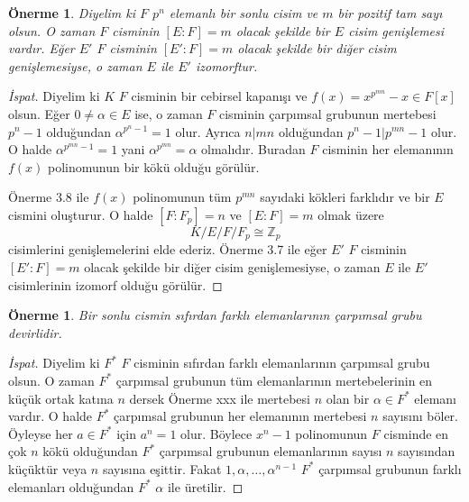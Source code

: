 \documentclass[draft]{article}
\newtheorem{prop}[thm]{Önerme}
\theoremstyle{definition}
\theoremstyle{remark}
\begin{document}
    	    \begin{prop}
    	        Diyelim ki $F$ $p^n$ elemanlı bir sonlu cisim ve $m$ bir pozitif tam sayı olsun. O zaman $F$ cisminin $[E : F] = m$ olacak şekilde bir $E$ cisim genişlemesi vardır. Eğer $E'$ $F$ cisminin $[E' : F] = m$ olacak şekilde bir diğer cisim genişlemesiyse, o zaman $E$ ile $E'$ izomorftur.
    	    \end{prop}
    	    
    	    \begin{proof}[İspat]
    	        Diyelim ki $K$ $F$ cisminin bir cebirsel kapanışı ve $f(x) = x^{p^{mn}} - x \in F[x]$ olsun. Eğer $0 \neq \alpha \in E$ ise, o zaman $F$ cisminin çarpımsal grubunun mertebesi $p^n - 1$ olduğundan $\alpha^{p^n - 1} = 1$ olur. Ayrıca $n | mn$ olduğundan $p^n - 1 | p^{mn} - 1$ olur. O halde $\alpha^{p^{mn} - 1} = 1$ yani $\alpha^{p^{mn}} = \alpha$ olmalıdır. Buradan $F$ cisminin her elemanının $f(x)$ polinomunun bir kökü olduğu görülür.\par
    	        Önerme 3.8 ile $f(x)$ polinomunun tüm $p^{mn}$ sayıdaki kökleri farklıdır ve bir $E$ cismini oluşturur. O halde $[F : F_p] = n$ ve $[E : F] = m$ olmak üzere
    	        \begin{equation*}
    	            K / E / F / F_p \cong \mathbb{Z}_p
    	        \end{equation*}
    	        cisimlerini genişlemelerini elde ederiz. Önerme 3.7 ile eğer $E'$ $F$ cisminin $[E' : F] = m$ olacak şekilde bir diğer cisim genişlemesiyse, o zaman $E$ ile $E'$ cisimlerinin izomorf olduğu görülür.
    	    \end{proof}
    	    
    	    \begin{prop}
    	        Bir sonlu cismin sıfırdan farklı elemanlarının çarpımsal grubu devirlidir.
    	    \end{prop}
    	    
    	    \begin{proof}[İspat]
    	        Diyelim ki $F^*$ $F$ cisminin sıfırdan farklı elemanlarının çarpımsal grubu olsun. O zaman $F^*$ çarpımsal grubunun tüm elemanlarının mertebelerinin en küçük ortak katına $n$ dersek Önerme xxx ile mertebesi $n$ olan bir $\alpha \in F^*$ elemanı vardır. O halde $F^*$ çarpımsal grubunun her elemanının mertebesi $n$ sayısını böler. Öyleyse her $a \in F^*$ için $a^n = 1$ olur. Böylece $x^n - 1$ polinomunun $F$ cisminde en çok $n$ kökü olduğundan $F^*$ çarpımsal grubunun elemanlarının sayısı $n$ sayısından küçüktür veya $n$ sayısına eşittir. Fakat $1, \alpha, \dots, \alpha^{n - 1}$ $F^*$ çarpımsal grubunun farklı elemanları olduğundan $F^*$ $\alpha$ ile üretilir.
    	    \end{proof}
    	    
\end{document}

